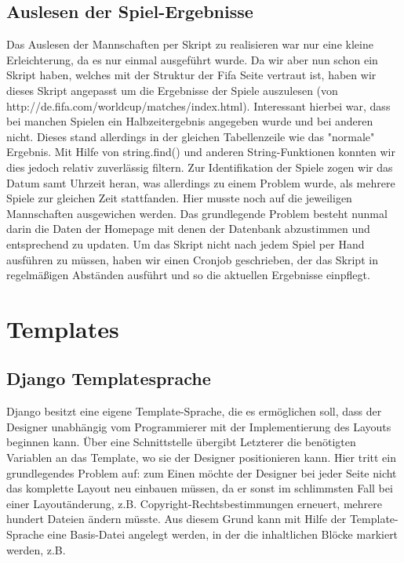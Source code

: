 \documentclass[titlepage, 12pt,a4paper]{scrartcl}
\begin{document}
\subsection{Auslesen der Spiel-Ergebnisse}
Das Auslesen der Mannschaften per Skript zu realisieren war nur eine kleine 
Erleichterung, da es nur einmal ausgeführt wurde. Da wir aber nun schon ein 
Skript haben, welches mit der Struktur der Fifa Seite vertraut ist, haben wir 
dieses Skript angepasst um die Ergebnisse der Spiele auszulesen  (von
http://de.fifa.com/worldcup/matches/index.html). Interessant hierbei war, dass 
bei manchen Spielen ein Halbzeitergebnis angegeben wurde und bei anderen nicht.
Dieses stand allerdings in der gleichen Tabellenzeile wie das "normale" 
Ergebnis. Mit Hilfe von string.find() und anderen String-Funktionen konnten wir
dies jedoch relativ zuverlässig filtern. Zur Identifikation der Spiele zogen
wir  das Datum samt Uhrzeit heran, was allerdings zu einem Problem wurde, als 
mehrere Spiele zur gleichen Zeit stattfanden. Hier musste noch auf die 
jeweiligen Mannschaften ausgewichen werden. Das grundlegende Problem besteht 
nunmal darin die Daten der Homepage mit denen der Datenbank abzustimmen und 
entsprechend zu updaten. Um das Skript nicht nach jedem Spiel per Hand
ausführen  zu müssen, haben wir einen Cronjob geschrieben, der das Skript in 
regelmäßigen Abständen ausführt und so die aktuellen Ergebnisse einpflegt.

\section{Templates}
\subsection{Django Templatesprache}
Django besitzt eine eigene Template-Sprache, die es ermöglichen soll, dass der 
Designer unabhängig vom Programmierer mit der Implementierung des Layouts 
beginnen kann. Über eine Schnittstelle übergibt Letzterer die benötigten 
Variablen an das Template, wo sie der Designer positionieren kann. Hier tritt 
ein grundlegendes Problem auf: zum Einen möchte der Designer bei jeder Seite 
nicht das komplette Layout neu einbauen müssen, da er sonst im schlimmsten Fall
bei einer Layoutänderung, z.B. Copyright-Rechtsbestimmungen erneuert, mehrere 
hundert Dateien ändern müsste. Aus diesem Grund kann mit Hilfe der 
Template-Sprache eine Basis-Datei angelegt werden, in der die inhaltlichen 
Blöcke markiert werden, z.B.
\end{document}
